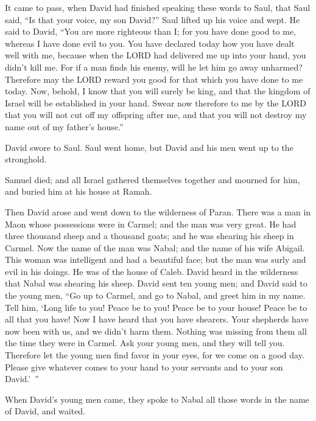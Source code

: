 \myverse{}It came to pass, when David had finished speaking these words
to Saul, that Saul said, “Is that your voice, my son David?” Saul lifted up his voice and wept.
\myverse{}He said to David, “You are more righteous than I; for you have done good
to me, whereas I have done evil to you.
\myverse{}You have declared today how you have dealt well with me, because when the
LORD had delivered me up into your hand, you didn’t kill me.
\myverse{}For if a man finds his enemy, will he let him go away unharmed? Therefore
may the LORD reward you good for that which you have done to me today.
\myverse{}Now, behold, I know that you will surely be king, and that the kingdom of
Israel will be established in your hand.
\myverse{}Swear now therefore to me by the LORD that you will not cut off my offspring
after me, and that you will not destroy my name out of my father’s house.”

\myverse{}David swore to Saul. Saul went home, but David and his men went
up to the stronghold.


\mychapter{} \myverse*{}Samuel died; and all Israel gathered themselves together and mourned
for him, and buried him at his house at Ramah.

Then David arose and went down to the wilderness of Paran.
\myverse{}There was a man in Maon whose possessions were in Carmel; and the man was very
great. He had three thousand sheep and a thousand goats; and he was shearing his sheep in Carmel.
\myverse{}Now the name of the man was Nabal; and the name of his wife Abigail. This woman
was intelligent and had a beautiful face; but the man was surly and evil in his doings. He was of the
house of Caleb.
\myverse{}David heard in the wilderness that Nabal was shearing his sheep.
\myverse{}David sent ten young men; and David said to the young men, “Go up to Carmel,
and go to Nabal, and greet him in my name.
\myverse{}Tell him, ‘Long life to you! Peace be to you! Peace be to your house! Peace
be to all that you have!
\myverse{}Now I have heard that you have shearers. Your shepherds have now been with
us, and we didn’t harm them. Nothing was missing from them all the time they were in Carmel.
\myverse{}Ask your young men, and they will tell you. Therefore let the young men find
favor in your eyes, for we come on a good day. Please give whatever comes to your hand to your servants
and to your son David.’ ”

\myverse{}When David’s young men came, they spoke to Nabal all those words
in the name of David, and waited.

